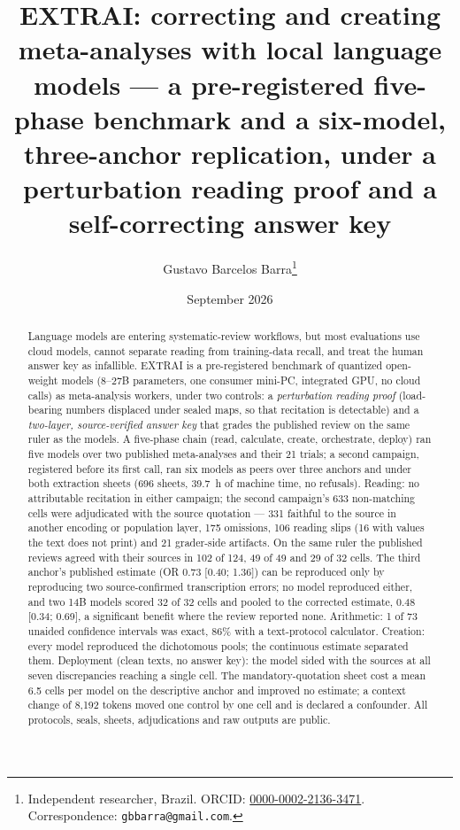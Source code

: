 \documentclass[11pt]{article}
\title{\textbf{EXTRAI: correcting and creating meta-analyses with local language models --- a pre-registered five-phase benchmark and a six-model, three-anchor replication, under a perturbation reading proof and a self-correcting answer key}}
\author{Gustavo Barcelos Barra\thanks{Independent researcher, Brazil. ORCID: \href{https://orcid.org/0000-0002-2136-3471}{0000-0002-2136-3471}. Correspondence: \texttt{gbbarra@gmail.com}.}}
\date{September 2026}
\begin{document}
\maketitle

\begin{abstract}
\noindent Language models are entering systematic-review workflows, but most evaluations use cloud models, cannot separate reading from training-data recall, and treat the human answer key as infallible. EXTRAI is a pre-registered benchmark of quantized open-weight models (8--27B parameters, one consumer mini-PC, integrated GPU, no cloud calls) as meta-analysis workers, under two controls: a \emph{perturbation reading proof} (load-bearing numbers displaced under sealed maps, so that recitation is detectable) and a \emph{two-layer, source-verified answer key} that grades the published review on the same ruler as the models. A five-phase chain (read, calculate, create, orchestrate, deploy) ran five models over two published meta-analyses and their 21 trials; a second campaign, registered before its first call, ran six models as peers over three anchors and under both extraction sheets (696 sheets, 39.7~h of machine time, no refusals). Reading: no attributable recitation in either campaign; the second campaign's 633 non-matching cells were adjudicated with the source quotation --- 331 faithful to the source in another encoding or population layer, 175 omissions, 106 reading slips (16 with values the text does not print) and 21 grader-side artifacts. On the same ruler the published reviews agreed with their sources in 102 of 124, 49 of 49 and 29 of 32 cells. The third anchor's published estimate (OR 0.73 [0.40; 1.36]) can be reproduced only by reproducing two source-confirmed transcription errors; no model reproduced either, and two 14B models scored 32 of 32 cells and pooled to the corrected estimate, 0.48 [0.34; 0.69], a significant benefit where the review reported none. Arithmetic: 1 of 73 unaided confidence intervals was exact, 86\% with a text-protocol calculator. Creation: every model reproduced the dichotomous pools; the continuous estimate separated them. Deployment (clean texts, no answer key): the model sided with the sources at all seven discrepancies reaching a single cell. The mandatory-quotation sheet cost a mean 6.5 cells per model on the descriptive anchor and improved no estimate; a context change of 8{,}192 tokens moved one control by one cell and is declared a confounder. All protocols, seals, sheets, adjudications and raw outputs are public.
\end{abstract}
\end{document}
